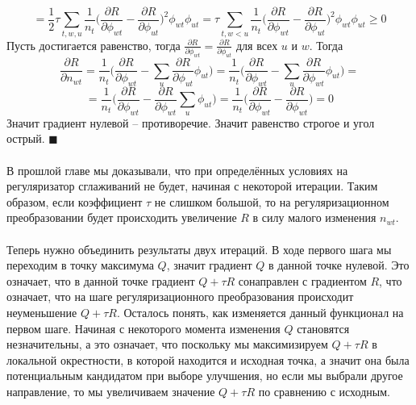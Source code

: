\documentclass[12pt]{article}
\newenvironment{Proof} 
	{\par\noindent{\bf Доказательство.}} 
	{\hfill$\blacksquare$}
\renewcommand{\geq}{\geqslant}
\begin{document}
\begin{Proof}
\[\]
\[
= \frac12 \tau \sum\limits_{t, w, u}  \frac{1}{n_{t}} \bigg(  \frac{\partial{R}}{\partial{\phi_{wt}}}  -  \frac{\partial{R}}{\partial{\phi_{ut}}}  \bigg)^2 \phi_{wt} \phi_{ut} = \tau \sum\limits_{t, w < u}  \frac{1}{n_{t}} \bigg(  \frac{\partial{R}}{\partial{\phi_{wt}}}  -  \frac{\partial{R}}{\partial{\phi_{ut}}}  \bigg)^2 \phi_{wt} \phi_{ut} \geq 0
\]
Пусть достигается равенство, тогда $\frac{\partial{R}}{\partial{\phi_{wt}}}  =  \frac{\partial{R}}{\partial{\phi_{ut}}}$ для всех $u$ и $w$. Тогда
\[
\frac{\partial{R}}{\partial{n_{wt}}} = \frac{1}{n_t} \bigg( \frac{\partial{R}}{\partial{\phi_{wt}}} - \sum_{u}  \frac{\partial{R}}{\partial{\phi_{ut}}} \phi_{ut} \bigg) = \frac{1}{n_t} \bigg( \frac{\partial{R}}{\partial{\phi_{wt}}} - \sum_{u}  \frac{\partial{R}}{\partial{\phi_{wt}}} \phi_{ut} \bigg) =
\]
\[
=\frac{1}{n_t} \bigg( \frac{\partial{R}}{\partial{\phi_{wt}}} - \frac{\partial{R}}{\partial{\phi_{wt}}} \sum_{u} \phi_{ut} \bigg)  = \frac{1}{n_t} \bigg( \frac{\partial{R}}{\partial{\phi_{wt}}} - \frac{\partial{R}}{\partial{\phi_{wt}}} \bigg) = 0
\]
Значит градиент нулевой -- противоречие. Значит равенство строгое и угол острый.
\end{Proof}\ \\
\ \\
В прошлой главе мы доказывали, что при определённых условиях на регуляризатор сглаживаний не будет, начиная с некоторой итерации. Таким образом, если коэффициент $\tau$ не слишком большой, то на регуляризационном преобразовании будет происходить увеличение $R$ в силу малого изменения $n_{wt}$.\\
\ \\
Теперь нужно объединить результаты двух итераций. В ходе первого шага мы переходим в точку максимума $Q$, значит градиент $Q$ в данной точке нулевой. Это означает, что в данной точке градиент $Q + \tau R$ сонаправлен с градиентом $R$, что означает, что на шаге регуляризационного преобразования происходит неуменьшение $Q + \tau R$. Осталось понять, как изменяется данный функционал на первом шаге. Начиная с некоторого момента изменения $Q$ становятся незначительны, а это означает, что поскольку мы максимизируем $Q + \tau R$ в локальной окрестности, в которой находится и исходная точка, а значит она была потенциальным кандидатом при выборе улучшения, но если мы выбрали другое направление, то мы увеличиваем значение $Q + \tau R$ по сравнению с исходным.\\
\ \\
\end{document}
